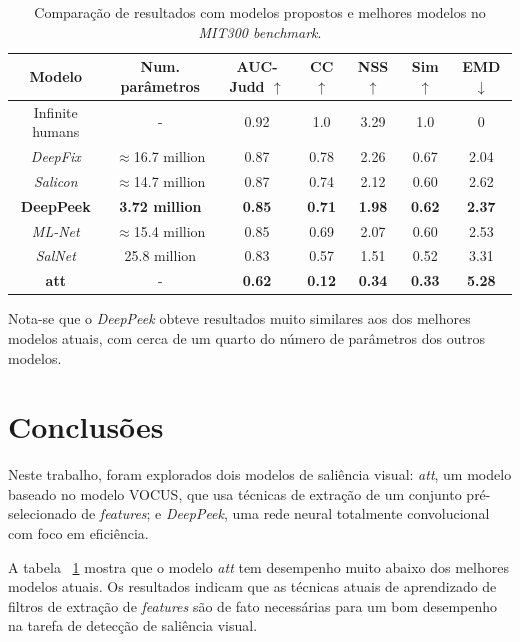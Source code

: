 \documentclass[11pt]{article}
\newcommand{\tit}[1]{\textit{#1}}
\begin{document}
\begin{table}[!htb]
	\small
    \centering
    \label{table:results}
    \caption{Comparação de resultados com modelos propostos e melhores
        modelos no \emph{MIT300 benchmark}.}
    \begin{tabular}{|c|c|c|c|c|c|c|}
        \hline
        Modelo & Num. parâmetros & AUC-Judd $\uparrow$ & CC $\uparrow$
            & NSS $\uparrow$ & Sim $\uparrow$ & EMD $\downarrow$\\
        \hline
        Infinite humans & - & 0.92 & 1.0 & 3.29 & 1.0 & 0\\
        \hline
        \emph{DeepFix} & $\approx$16.7 million & 0.87 & 0.78
            & 2.26 & 0.67 & 2.04\\
        \hline
        \emph{Salicon} & $\approx$14.7 million & 0.87 & 0.74 & 2.12
            & 0.60 & 2.62\\
        \hline
        \textbf{DeepPeek} & \textbf{3.72 million} & \textbf{0.85} &
        \textbf{0.71} & \textbf{1.98} & \textbf{0.62} & \textbf{2.37}\\
        \hline
        \emph{ML-Net} & $\approx$15.4 million & 0.85 & 0.69 & 2.07 & 0.60
            & 2.53\\
        \hline
        \emph{SalNet} & 25.8 million & 0.83 & 0.57 & 1.51 & 0.52 & 3.31\\
        \hline
        \textbf{att} & - & \textbf{0.62} &
        \textbf{0.12} & \textbf{0.34} & \textbf{0.33} & \textbf{5.28}\\
        \hline
    \end{tabular}
\end{table}

Nota-se que o \tit{DeepPeek} obteve resultados muito similares aos dos
melhores modelos atuais, com cerca de um quarto do número de parâmetros dos
outros modelos.

\section{Conclusões}
Neste trabalho, foram explorados dois modelos de saliência visual:
\tit{att}, um modelo baseado no modelo VOCUS,
que usa técnicas de extração de um conjunto pré-selecionado de \tit{features};
e \tit{DeepPeek}, uma rede neural totalmente convolucional com foco em
eficiência.

A tabela ~\ref{table:results} mostra que o modelo \tit{att} tem desempenho
muito abaixo dos melhores modelos atuais.
Os resultados indicam que as técnicas atuais de aprendizado
de filtros de extração de \tit{features} são de fato necessárias para
um bom desempenho na tarefa de detecção de saliência visual.
\end{document}
